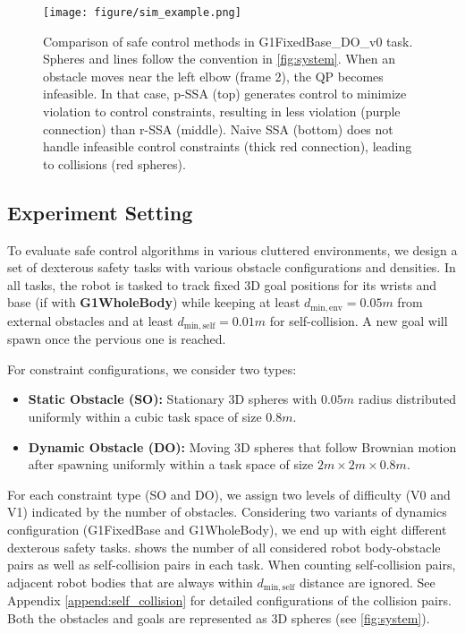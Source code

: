 \begin{figure*}[ht]
\centering
    \texttt{[image: figure/sim\_example.png]}
    \caption{Comparison of safe control methods in G1FixedBase\_DO\_v0 task. Spheres and lines follow the convention in \cref{fig:system}. When an obstacle moves near the left elbow (frame 2), the QP becomes infeasible. In that case, p-SSA (top) generates control to minimize violation to control constraints, resulting in less violation (purple connection) than r-SSA (middle). Naive SSA (bottom) does not handle infeasible control constraints (thick red connection), leading to collisions (red spheres).}
\label{fig: sim_example}
\end{figure*}




\subsection{Experiment Setting}\label{sec:exp_setting}

To evaluate safe control algorithms in various cluttered environments, we design a set of dexterous safety tasks with various obstacle configurations and densities.
In all tasks, the robot is tasked to track fixed 3D goal positions for its wrists and base (if with \textbf{G1WholeBody}) while keeping at least $d_\mathrm{min,env}=0.05 m$ from external obstacles and at least $d_\mathrm{min,self}=0.01m$ for self-collision.
A new goal will spawn once the pervious one is reached.

For constraint configurations, we consider two types:
\begin{itemize}
\item \textbf{Static Obstacle (SO):} Stationary 3D spheres with $0.05m$ radius distributed uniformly within a cubic task space of size $0.8m$.
\item \textbf{Dynamic Obstacle (DO):} Moving 3D spheres that follow Brownian motion after spawning uniformly within a task space of size $2m\times 2m\times 0.8m$.
\end{itemize}



For each constraint type (SO and DO), we assign two levels of difficulty (V0 and V1) indicated by the number of obstacles.
Considering two variants of dynamics configuration (G1FixedBase and G1WholeBody), we end up with eight different dexterous safety tasks.
 shows the number of all considered robot body-obstacle pairs as well as self-collision pairs in each task.
When counting self-collision pairs, adjacent robot bodies that are always within $d_\mathrm{min,self}$ distance are ignored.
See Appendix \ref{append:self_collision} for detailed configurations of the collision pairs.
Both the obstacles and goals are represented as 3D spheres (see \cref{fig:system}).



